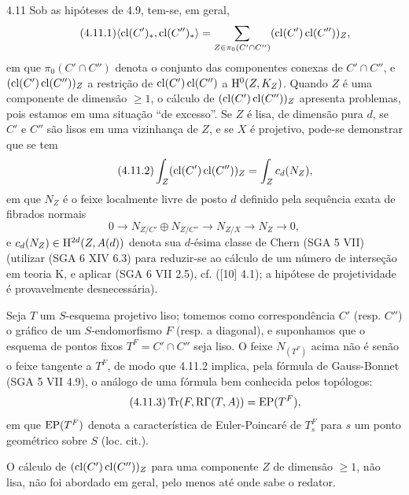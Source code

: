 \begin{statement}{4.11}
Sob as hipóteses de 4.9, tem-se, em geral,
\begin{equation}
\tag{4.11.1}
\langle \operatorname{cl}(C')_*,\operatorname{cl}(C'')_*\rangle
=
\sum_{Z\in\pi_0(C'\cap C'')}(\operatorname{cl}(C')\operatorname{cl}(C''))_Z,
\end{equation}
em que $\pi_0(C'\cap C'')$ denota o conjunto das componentes conexas de $C'\cap C''$, e $(\operatorname{cl}(C')\operatorname{cl}(C''))_Z$ a restrição de $\operatorname{cl}(C')\operatorname{cl}(C'')$ a $\mathrm{H}^0(Z,K_Z)$. Quando $Z$ é uma componente de dimensão $\geq 1$, o cálculo de $(\operatorname{cl}(C')\operatorname{cl}(C''))_Z$ apresenta problemas, pois estamos em uma situação ``de excesso''. Se $Z$ é lisa, de dimensão pura $d$, se $C'$ e $C''$ são lisos em uma vizinhança de $Z$, e se $X$ é projetivo, pode-se demonstrar que se tem
\begin{equation}
\tag{4.11.2}
\int_Z(\operatorname{cl}(C')\operatorname{cl}(C''))_Z=\int_Z c_d(N_Z),
\end{equation}
em que $N_Z$ é o feixe localmente livre de posto $d$ definido pela sequência exata de fibrados normais
\[
0\longrightarrow N_{Z/C'}\oplus N_{Z/C''}\longrightarrow N_{Z/X}\longrightarrow N_Z\longrightarrow 0,
\]
e $c_d(N_Z)\in \mathrm{H}^{2d}(Z,A(d))$ denota sua $d$-ésima classe de Chern (SGA 5 VII) (utilizar (SGA 6 XIV 6.3) para reduzir-se ao cálculo de um número de interseção em teoria K, e aplicar (SGA 6 VII 2.5), cf. ([10] 4.1); a hipótese de projetividade é provavelmente desnecessária).

Seja $T$ um $S$-esquema projetivo liso; tomemos como correspondência $C'$ (resp. $C''$) o gráfico de um $S$-endomorfismo $F$ (resp. a diagonal), e suponhamos que o esquema de pontos fixos $T^F=C'\cap C''$ seja liso. O feixe $N_{(T^F)}$ acima não é senão o feixe tangente a $T^F$, de modo que 4.11.2 implica, pela fórmula de Gauss-Bonnet (SGA 5 VII 4.9), o análogo de uma fórmula bem conhecida pelos topólogos:
\begin{equation}
\tag{4.11.3}
\operatorname{Tr}(F,\mathrm{R}\Gamma(T,A))=\operatorname{EP}(T^F),
\end{equation}
em que $\operatorname{EP}(T^F)$ denota a característica de Euler-Poincaré de $T_s^F$ para $s$ um ponto geométrico sobre $S$ (loc. cit.).
\end{statement}

O cálculo de $(\operatorname{cl}(C')\operatorname{cl}(C''))_Z$ para uma componente $Z$ de dimensão $\geq 1$, não lisa, não foi abordado em geral, pelo menos até onde sabe o redator.

